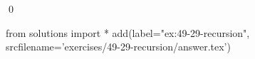 
\begin{ex}
  \label{ex:49-29-recursion}
  
  \qed
\end{ex}
\begin{python0}
from solutions import *
add(label="ex:49-29-recursion",
    srcfilename='exercises/49-29-recursion/answer.tex')
\end{python0}
